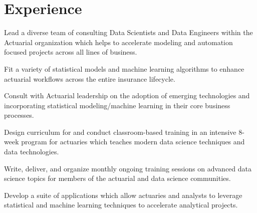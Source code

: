 \documentclass[letterpaper]{deedy-resume} %
\begin{document}
\begin{minipage}[t]{0.65\textwidth} %


\section{Experience}
\hfill{}
\hfill
{}
\vspace{\topsep}
\begin{tightitemize}
\item Lead a diverse team of consulting Data Scientists and Data Engineers
  within the Actuarial organization which helps to accelerate modeling and
  automation focused projects across all lines of business.  
\item Fit a variety of statistical models and machine learning algorithms to enhance
  actuarial workflows across the entire insurance lifecycle.
\item Consult with Actuarial leadership on the adoption of emerging technologies
  and incorporating statistical modeling/machine learning in their core business
  processes.   
\item Design curriculum for and conduct classroom-based training in an intensive
  8-week program for actuaries which teaches modern data science techniques and
  data technologies. 
\item Write, deliver, and organize monthly ongoing training sessions on advanced
  data science topics for members of the actuarial and data science communities.
\item Develop a suite of applications which allow actuaries and analysts to
  leverage statistical and machine learning techniques to accelerate analytical
  projects. 
\end{tightitemize}
\sectionspace


\end{minipage}
\end{document}

